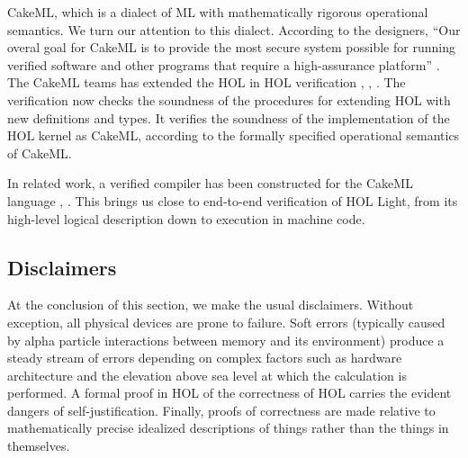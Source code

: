 \documentclass[brochure,english,12pt]{bourbaki}
\theoremstyle{plain}
\begin{document}
CakeML, which
is a dialect of ML with mathematically rigorous operational semantics.  We turn our
attention to this dialect.    According to the designers, ``Our overal goal for CakeML
is to provide the most secure system possible for running verified software and other programs that require a high-assurance
platform'' \cite{CakeML}.
The CakeML teams has extended the HOL in HOL verification \cite{myreen2013steps}, \cite{myreen2013proof}, 
\cite{kumar2014hol}.  
The verification now checks the soundness of  the procedures for extending HOL with new definitions and types.
It verifies the soundness of the implementation of the HOL kernel as CakeML, according to the formally specified 
operational semantics of CakeML.  

In related work, a verified compiler has been constructed for the CakeML language 
 \cite{CakeML}, \cite{sarkar2009semantics}.
This brings us close to end-to-end verification of HOL Light, from its high-level logical description down to
execution in machine code.





\bigskip


\subsection{Disclaimers}

At the conclusion of this section, we make the usual disclaimers.
Without exception, all physical devices are prone to failure.  Soft errors (typically 
caused by alpha particle interactions between memory and its environment) 
produce a steady
stream of errors depending on complex factors such as hardware architecture and
the elevation above sea level at which the
calculation is performed.  A formal proof in HOL of the correctness of HOL carries
the evident dangers of self-justification.  Finally, proofs of correctness are made relative to 
mathematically precise idealized descriptions of things rather than the things
in themselves.
\end{document}
